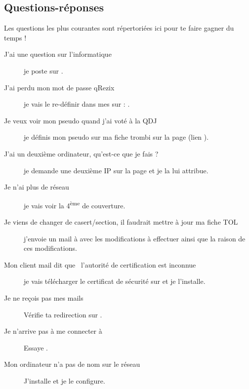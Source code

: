 
\subsection{Questions-réponses}

Les questions les plus courantes sont répertoriées ici pour te faire gagner du temps !

\begin{description}

\item[J'ai une question sur l'informatique] je poste sur .

\item[J'ai perdu mon mot de passe qRezix] je vais le re-définir dans mes   sur \fkz : .

\item[Je veux voir mon pseudo quand j'ai voté à la QDJ] je définis mon pseudo sur ma fiche trombi sur la page  (lien ).

\item[J'ai un deuxième ordinateur, qu'est-ce que je fais ?] je demande une deuxième IP sur la page  et je la lui attribue.

\item[Je n'ai plus de réseau] je vais voir la 4\textsuperscript{ème} de couverture.

\item[Je viens de changer de casert/section, il faudrait mettre à jour ma fiche TOL] j'envoie un mail à  avec les modifications à effectuer ainsi que la raison de ces
modifications.

\item[Mon client mail dit que \guillemotleft~l'autorité de certification est inconnue~\guillemotright ] je vais télécharger le certificat de sécurité sur  et je l'installe.

\item[Je ne reçois pas mes mails] Vérifie ta redirection sur .

\item[Je n'arrive pas à me connecter à ] Essaye .

\item[Mon ordinateur n'a pas de nom sur le réseau] J'installe  et je le configure.


\end{description}
